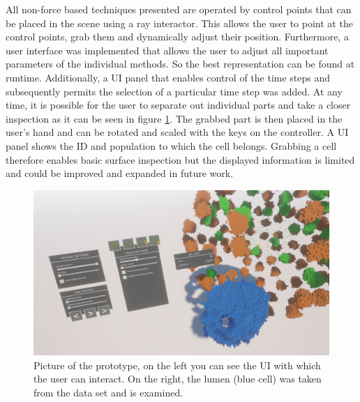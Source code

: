 All non-force based techniques presented are operated by control points that can be placed in the scene using a ray interactor. 
This allows the user to point at the control points, grab them and dynamically adjust their position.
Furthermore, a user interface was implemented that allows the user to adjust all important parameters of the individual methods. 
So the best representation can be found at runtime.  
Additionally, a UI panel that enables control of the time steps and subsequently permits the selection of a particular time step was added.
At any time, it is possible for the user to separate out individual parts and take a closer inspection as it can be seen in figure \ref{fig:Interaction}. 
The grabbed part is then placed in the user's hand and can be rotated and scaled with the keys on the controller. A UI panel shows the ID and population to which the cell belongs. 
Grabbing a cell therefore enables basic surface inspection but the displayed information is limited and could be improved and expanded in future work. 
\begin{figure}[h]
	\centering
	\includegraphics[width=1\linewidth]{fig/Images/Interaction}
	\caption[]{Picture of the prototype, on the left you can see the UI with which the user can interact. On the right, the lumen (blue cell) was taken from the data set and is examined. }
	\label{fig:Interaction}
\end{figure}




